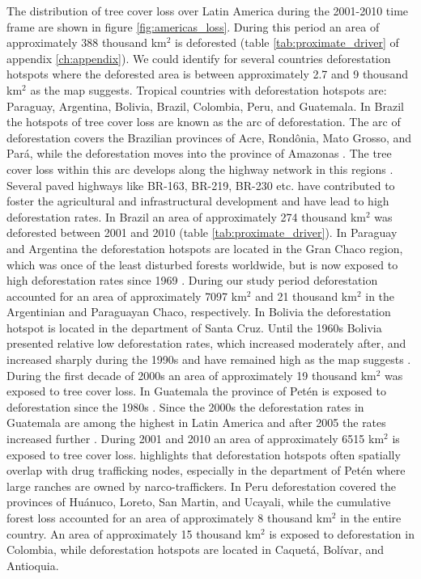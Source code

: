 			The distribution of tree cover loss over Latin America during the 2001-2010 time frame are shown in figure \ref{fig:americas_loss}. During this period an area of approximately 388 thousand km$^2$ is deforested (table \ref{tab:proximate_driver} of appendix \ref{ch:appendix}). We could identify for several countries deforestation hotspots where the deforested area is between approximately 2.7 and 9 thousand km$^2$ as the map suggests. Tropical countries with deforestation hotspots are: Paraguay, Argentina, Bolivia, Brazil, Colombia, Peru, and Guatemala. In Brazil the hotspots of tree cover loss are known as the arc of deforestation. The arc of deforestation covers the Brazilian provinces of Acre, Rond\^{o}nia, Mato Grosso, and Pará, while the deforestation moves into the province of Amazonas \citep{Wood2002}. The tree cover loss within this arc develops along the highway network in this regions \citep{Alves2002,Mueller2016}. Several paved highways like BR-163, BR-219, BR-230 etc. have contributed to foster the agricultural and infrastructural development and have lead to high deforestation rates. In Brazil an area of approximately 274 thousand km$^2$ was deforested between 2001 and 2010 (table \ref{tab:proximate_driver}). In Paraguay and Argentina the deforestation hotspots are located in the Gran Chaco region, which was once of the least disturbed forests worldwide, but is now exposed to high deforestation rates since 1969 \citep{Caldas2013,Zak2004}. During our study period deforestation accounted for an area of approximately 7097 km$^2$ and 21 thousand km$^2$ in the Argentinian and Paraguayan Chaco, respectively. In Bolivia the deforestation hotspot is located in the department of Santa Cruz. Until the 1960s Bolivia presented relative low deforestation rates, which increased moderately after, and increased sharply during the 1990s and have remained high as the map suggests \citep{Pacheco2002,DavidKaimowitz2002}. During the first decade of 2000s an area of approximately 19 thousand km$^2$ was exposed to tree cover loss. In Guatemala the province of Petén is exposed to deforestation since the 1980s \citep{Beach1998}. Since the 2000s the deforestation rates in Guatemala are among the highest in Latin America and after 2005 the rates increased further \citep{McSweeney2014}. During 2001 and 2010 an area of approximately 6515 km$^2$ is exposed to tree cover loss. \citet{McSweeney2014} highlights that deforestation hotspots often spatially overlap with drug trafficking nodes, especially in the department of Petén where large ranches are owned by narco-traffickers. In Peru deforestation covered the provinces of Huánuco, Loreto, San Martin, and Ucayali, while the cumulative forest loss accounted for an area of approximately 8 thousand km$^2$ in the entire country. An area of approximately 15 thousand km$^2$ is exposed to deforestation in Colombia, while deforestation hotspots are located in Caquetá, Bolívar, and Antioquia.
